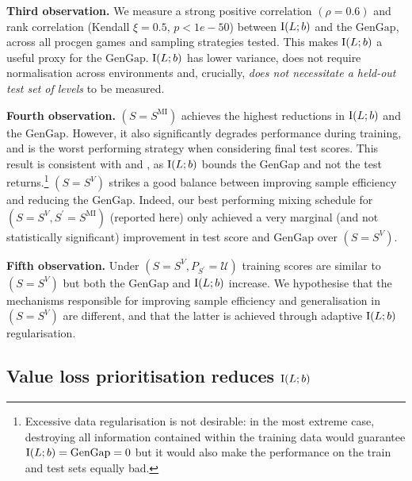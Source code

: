     \textbf{Third observation.} We measure a strong positive correlation $(\rho=0.6)$ and rank correlation (Kendall $\xi=0.5$, $p<1e-50$) between $\text{I}(L;b)$ and the $\text{GenGap}$, across all procgen games and sampling strategies tested. This makes $\text{I}(L;b)$ a useful proxy for the $\text{GenGap}$. $\text{I}(L;b)$ has lower variance, does not require normalisation across environments and, crucially, \textit{does not necessitate a held-out test set of levels} to be measured.
    
    \textbf{Fourth observation.} $(S=S^{\text{MI}})$ achieves the highest reductions in $\text{I}(L;b)$ and the $\text{GenGap}$. However, it also significantly degrades performance during training, and is the worst performing strategy when considering final test scores. This result is consistent with  and , as $\text{I}(L;b)$ bounds the GenGap and not the test returns.\footnote{Excessive data regularisation is not desirable: in the most extreme case, destroying all information contained within the training data would guarantee $\text{I}(L;b) = \text{GenGap} = 0$ but it would also make the performance on the train and test sets equally bad.} $(S=S^V)$ strikes a good balance between improving sample efficiency and reducing the $\text{GenGap}$. Indeed, our best performing mixing schedule for $(S=S^V, S^\prime=S^{\text{MI}})$ (reported here) only achieved a very marginal (and not statistically significant) improvement in test score and $\text{GenGap}$ over $(S=S^V)$.
    
    \textbf{Fifth observation.} Under $(S=S^V, P_{S^\prime}=\mathcal{U})$ training scores are similar to $(S=S^V)$ but both the $\text{GenGap}$ and $\text{I}(L;b)$ increase. We hypothesise that the mechanisms responsible for improving sample efficiency and generalisation in $(S=S^V)$ are different, and that the latter is achieved through adaptive $\text{I}(L;b)$ regularisation.
\subsection{Value loss prioritisation reduces $\text{I}(L;b)$}

